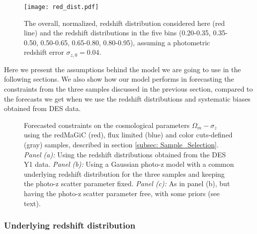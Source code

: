 \documentclass[a4paper,fleqn,usenatbib]{mnras}
\begin{document}
\begin{figure}
\centering
\texttt{[image: red\_dist.pdf]} 
\caption{The overall, normalized, redshift distribution considered here (red line)  and the redshift distributions in the five bins (0.20-0.35, 0.35-0.50, 0.50-0.65, 0.65-0.80, 0.80-0.95), assuming a photometric redshift error $\sigma_{z,0}=0.04$.}
\label{fig: red_dist_mod}
\end{figure}

Here we present the assumptions behind the model we are going to use in the following sections. We also show how our model performs in forecasting the constraints from the three samples discussed in the previous section, compared to the forecasts we get when we use the redshift distributions and systematic biases obtained from DES data.

\begin{figure*}
\centering
{}%
{}%
\caption{ Forecasted constraints on the cosmological parameters $\Omega_{m} - \sigma_z$ using the redMaGiC (red),  flux limited (blue) and color cuts-defined (gray) samples, described in section \ref{subsec: Sample_Selection}. {\textit{Panel (a):}} Using the redshift distributions obtained from the DES Y1 data. {\textit{Panel (b):}} Using a Gaussian photo-z model with a common underlying redshift distribution for the three samples and keeping the photo-z scatter parameter fixed.  {\textit{Panel (c):}} As in panel (b), but having the photo-z scatter parameter free, with some priors (see text).}
\label{fig: Data_and_model}
\end{figure*}


\subsubsection{Underlying redshift distribution}
\end{document}
